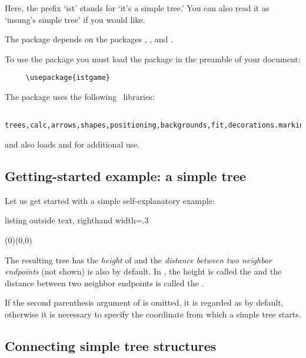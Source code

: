 
Here, the prefix `ist' stands for `it's a simple tree.' You can also read it as `insung's simple tree' if you would like.


The package  depends on the packages , , and .

To use the  package you must load the package in the preamble of your document:
\begin{verbatim}
     \usepackage{istgame}
\end{verbatim}
The package uses the following \TikZ\ libraries:
\begin{verbatim}
     trees,calc,arrows,shapes,positioning,backgrounds,fit,decorations.markings,
\end{verbatim}
and also loads  and  for additional use.


\subsection{Getting-started example: a simple tree}

Let us get started with a simple self-explanatory example:

\begin{tcblisting}{listing outside text, righthand width=.3\linewidth}
\begin{istgame}
\istroot(0)(0,0) %
  \istb %
  \istb %
  \istb %
  \endist %
\end{istgame}
\end{tcblisting}

The resulting tree has the \emph{height} of \xw{15mm} and 
the \emph{distance between two neighbor endpoints} (not shown) is also \xw{15mm} by default.
In \TikZ, the height is called the  and 
the distance between two neighbor endpoints is called the .

If the second parenthesis argument of \cmd{\istroot} is omitted, it is regarded as  by default, 
otherwise it is necessary to specify the coordinate from which a simple tree starts.

\subsection{Connecting simple tree structures}


